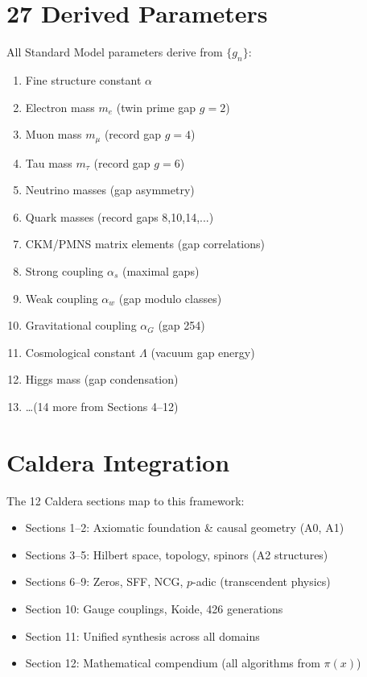 \documentclass[11pt,a4paper]{article}
\begin{document}
\section{27 Derived Parameters}

All Standard Model parameters derive from $\{g_n\}$:
\begin{enumerate}
    \item Fine structure constant $\alpha$
    \item Electron mass $m_e$ (twin prime gap $g=2$)
    \item Muon mass $m_\mu$ (record gap $g=4$)
    \item Tau mass $m_\tau$ (record gap $g=6$)
    \item Neutrino masses (gap asymmetry)
    \item Quark masses (record gaps 8,10,14,...)
    \item CKM/PMNS matrix elements (gap correlations)
    \item Strong coupling $\alpha_s$ (maximal gaps)
    \item Weak coupling $\alpha_w$ (gap modulo classes)
    \item Gravitational coupling $\alpha_G$ (gap 254)
    \item Cosmological constant $\Lambda$ (vacuum gap energy)
    \item Higgs mass (gap condensation)
    \item \ldots (14 more from Sections 4--12)
\end{enumerate}

\section{Caldera Integration}

The 12 Caldera sections map to this framework:
\begin{itemize}
    \item Sections 1--2: Axiomatic foundation \& causal geometry (A0, A1)
    \item Sections 3--5: Hilbert space, topology, spinors (A2 structures)
    \item Sections 6--9: Zeros, SFF, NCG, $p$-adic (transcendent physics)
    \item Section 10: Gauge couplings, Koide, 426 generations
    \item Section 11: Unified synthesis across all domains
    \item Section 12: Mathematical compendium (all algorithms from $\pi(x)$)
\end{itemize}
\end{document}
